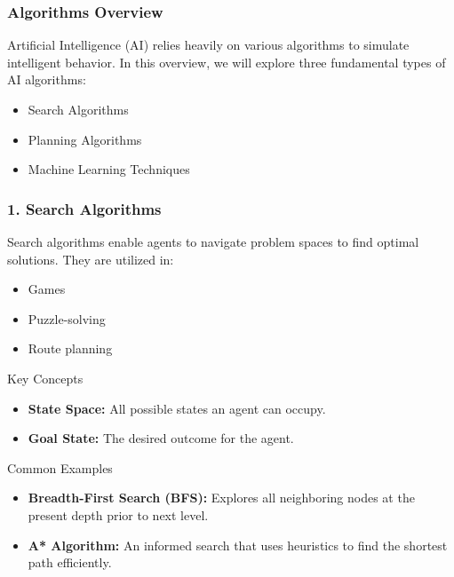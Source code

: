 \documentclass[aspectratio=169]{beamer}
\begin{document}
\begin{frame}[fragile]
  \frametitle{Algorithms Overview}
  Artificial Intelligence (AI) relies heavily on various algorithms to simulate intelligent behavior. In this overview, we will explore three fundamental types of AI algorithms:
  \begin{itemize}
    \item Search Algorithms
    \item Planning Algorithms
    \item Machine Learning Techniques
  \end{itemize}
\end{frame}

\begin{frame}[fragile]
  \frametitle{1. Search Algorithms}
  Search algorithms enable agents to navigate problem spaces to find optimal solutions. They are utilized in:
  \begin{itemize}
    \item Games
    \item Puzzle-solving
    \item Route planning
  \end{itemize}
  
  \begin{block}{Key Concepts}
    \begin{itemize}
      \item \textbf{State Space:} All possible states an agent can occupy.
      \item \textbf{Goal State:} The desired outcome for the agent.
    \end{itemize}
  \end{block}
  
  \begin{block}{Common Examples}
    \begin{itemize}
      \item \textbf{Breadth-First Search (BFS):} Explores all neighboring nodes at the present depth prior to next level.
      \item \textbf{A* Algorithm:} An informed search that uses heuristics to find the shortest path efficiently.
    \end{itemize}
  \end{block}
\end{frame}
\end{document}
